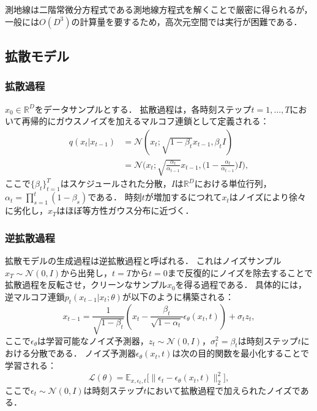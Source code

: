 \documentclass[MIRU,submit]{miru2026j}
\theoremstyle{definition}
\begin{document}
測地線は二階常微分方程式である測地線方程式を解くことで厳密に得られるが，一般には$O(D^3)$の計算量を要するため，高次元空間では実行が困難である．

\subsection{拡散モデル}\label{appendix:diffusion_models}

\subsubsection{拡散過程}
$x_0 \in \mathbb{R}^D$をデータサンプルとする．
拡散過程は，各時刻ステップ$t=1,\dots,T$において再帰的にガウスノイズを加えるマルコフ連鎖として定義される：
\begin{equation}
    \label{eq:forward}
    \begin{aligned}
        \textstyle q({x_t}|{x}_{t-1})
         & \textstyle =\mathcal{N}\left({x}_t;\sqrt{1-\beta_t}{x}_{t-1},\beta_t I\right)                                                     \\
         & \textstyle =\mathcal{N}\Big({x}_t;\sqrt{\frac{\alpha_t}{\alpha_{t-1}}}{x}_{t-1}, \Big(1-\frac{\alpha_t}{\alpha_{t-1}}\Big)I\Big),
    \end{aligned}
\end{equation}
ここで$\{\beta_t\}_{t=1}^T$はスケジュールされた分散，$I$は$\mathbb{R}^D$における単位行列，$\alpha_t=\prod_{s=1}^t(1-\beta_s)$である．
時刻$t$が増加するにつれて$x_t$はノイズにより徐々に劣化し，$x_T$はほぼ等方性ガウス分布に近づく．

\subsubsection{逆拡散過程}
拡散モデルの生成過程は逆拡散過程と呼ばれる．
これはノイズサンプル${x}_T\sim\mathcal{N}(0,I)$から出発し，$t=T$から$t=0$まで反復的にノイズを除去することで拡散過程を反転させ，クリーンなサンプル$x_0$を得る過程である．
具体的には，逆マルコフ連鎖$p_t({x}_{t-1}|{x}_t;\theta)$が以下のように構築される：
\begin{equation}
    \label{eq:backward}
    \textstyle
    {x}_{t-1}=\frac{1}{\sqrt{1-\beta_t}}\left({x_t}-\frac{\beta_t}{\sqrt{1-\alpha_t}}{\epsilon}_\theta({x}_t, t)\right)+\sigma_t{z}_t,
\end{equation}
ここで${\epsilon}_\theta$は学習可能なノイズ予測器，${z}_t \sim \mathcal{N}(0,I)$，$\sigma_t^2 = \beta_t$は時刻ステップ$t$における分散である．
ノイズ予測器${\epsilon}_\theta({x}_t,t)$は次の目的関数を最小化することで学習される：
\begin{equation}
    \label{eq:ddpm_obj}
    \textstyle
    \mathcal{L}(\theta)=\mathbb{E}_{{x},{\epsilon}_t, t}\big[\|{\epsilon}_t-{\epsilon}_\theta({x}_t, t)\|_2^2\big],
\end{equation}
ここで${\epsilon}_t\sim\mathcal{N}(0,I)$は時刻ステップ$t$において拡散過程で加えられたノイズである．
\end{document}
